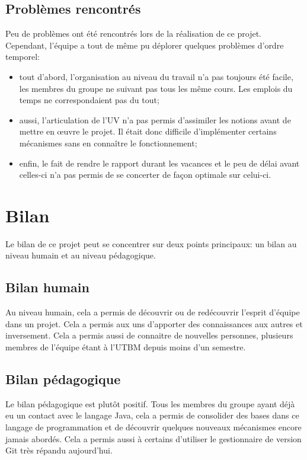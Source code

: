 \documentclass[a4paper, 11pt]{article}
\begin{document}
		\subsection{Problèmes rencontrés}
		
		Peu de problèmes ont été rencontrés lors de la réalisation de ce projet. Cependant, l'équipe a tout de même pu déplorer quelques problèmes d'ordre temporel:
		\begin{itemize}
			\item tout d'abord, l'organisation au niveau du travail n'a pas toujours été facile, les membres du groupe ne suivant pas tous les même cours. Les emplois du temps ne correspondaient pas du tout;
			\item aussi, l'articulation de l'UV n'a pas permis d'assimiler les notions avant de mettre en œuvre le projet. Il était donc difficile d'implémenter certains mécanismes sans en connaître le fonctionnement;
			\item enfin, le fait de rendre le rapport durant les vacances et le peu de délai avant celles-ci n'a pas permis de se concerter de façon optimale sur celui-ci.
		\end{itemize}
		
		\newpage 
		
	\section{Bilan}
	
	Le bilan de ce projet peut se concentrer sur deux points principaux: un bilan au niveau humain et au niveau pédagogique. 
	
		\subsection{Bilan humain}
		
		Au niveau humain, cela a permis de découvrir ou de redécouvrir l'esprit d'équipe dans un projet. Cela a permis aux uns d'apporter des connaissances aux autres et inversement. Cela a permis aussi de connaitre de nouvelles personnes, plusieurs membres de l'équipe étant à l'UTBM depuis moins d'un semestre.
		
		\subsection{Bilan pédagogique}
		
		Le bilan pédagogique est plutôt positif. Tous les membres du groupe ayant déjà eu un contact avec le langage Java, cela a permis de consolider des bases dans ce langage de programmation et de découvrir quelques nouveaux mécanismes encore jamais abordés. Cela a permis aussi à certains d'utiliser le gestionnaire de version Git très répandu aujourd'hui. 
		
\end{document}
